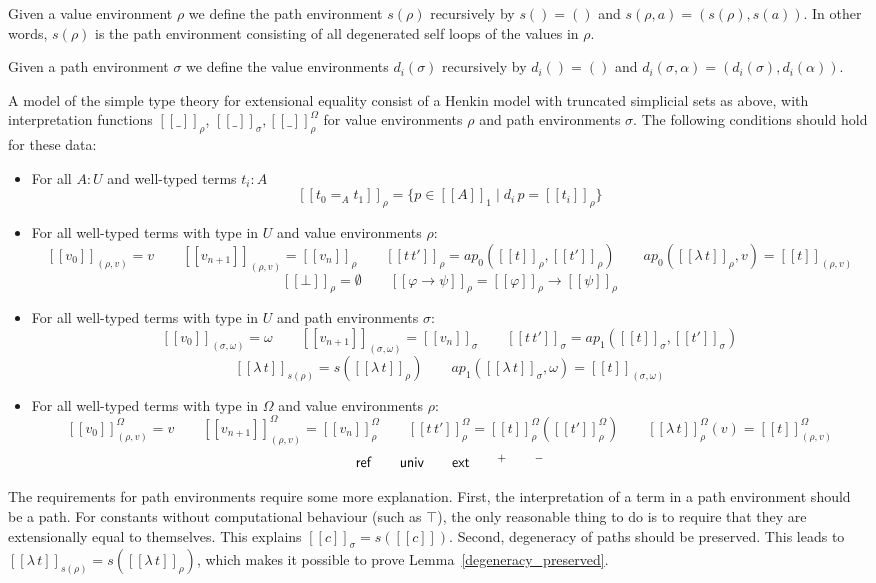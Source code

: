 \documentclass[10pt,a4paper]{article}
\newcommand{\sbr}[1]{[\![#1]\!]}
\newcommand{\semr}[1]{[\![#1]\!]_{\rho}}
\newcommand{\semrO}[1]{[\![#1]\!]^{\Omega}_{\rho}}
\newcommand{\sems}[1]{[\![#1]\!]_{\sigma}}
\newcommand{\set}[1]{\{#1\}}
\newcommand{\Ref}{{\sf ref}}
\newcommand{\ext}{{\sf ext}}
\newcommand{\univ}{{\sf univ}}
\begin{document}
Given a value environment $\rho$ we define the path environment 
$s(\rho)$ recursively by $s()=()$ and $s(\rho,a)=(s(\rho),s(a))$. 
In other words, $s(\rho)$ is the path environment consisting of all degenerated
self loops of the values in $\rho$.

Given a path environment $\sigma$ we define the value environments
$d_i(\sigma)$ recursively by $d_i()=()$ and $d_i(\sigma,\alpha)=(d_i(\sigma),d_i(\alpha))$.

\begin{definition}
A model of the simple type theory for extensional equality consist of
a Henkin model with truncated simplicial sets as above, with
interpretation functions $\semr{\_}$, $\sems{\_}, \semrO{\_}$ for value
environments $\rho$ and path environments $\sigma$. 
The following conditions should hold for these data:
\begin{itemize}
\item For all $A:U$ and well-typed terms $t_i:A$
\[
\semr{t_0 =_A t_1} = \set{p\in\sbr{A}_1 \mid d_i\,p = \semr{t_i}}
\]
\item For all well-typed terms with type in $U$ and value environments $\rho$:
\[
\sbr{v_0}_{(\rho,v)} = v
\quad\quad \sbr{v_{n+1}}_{(\rho,v)} = \semr{v_n}
\quad\quad \semr{t\,t'} = ap_0(\semr{t},\semr{t'})
\quad\quad ap_0(\semr{\lambda\,t},v) = \sbr{t}_{(\rho,v)}
\]
\[
\semr{\bot}=\emptyset
\quad\quad \semr{\varphi\to\psi}=\semr{\varphi}\to\semr{\psi}
\]
\item For all well-typed terms with type in $U$ and path environments $\sigma$:
\[
\sbr{v_0}_{(\sigma,\omega)} = \omega
\quad\quad  \sbr{v_{n+1}}_{(\sigma,\omega)} = \sems{v_n}
\quad\quad \sems{t\,t'} = ap_1(\sems{t},\sems{t'})
\]
\[
\sbr{\lambda\,t}_{s(\rho)} = s(\semr{\lambda\,t})
\quad\quad ap_1(\sems{\lambda\,t},\omega) = \sbr{t}_{(\sigma,\omega)}
\]
\item For all well-typed terms with type in $\Omega$ and value environments $\rho$:
\[
\sbr{v_0}^{\Omega}_{(\rho,v)} = v
\quad\quad \sbr{v_{n+1}}^{\Omega}_{(\rho,v)} = \semrO{v_n}
\quad\quad \semrO{t\,t'} = \semrO{t}(\semrO{t'})
\quad\quad \semrO{\lambda\,t}(v) = \sbr{t}^{\Omega}_{(\rho,v)}
\]
\[
\Ref\quad\quad\univ\quad\quad\ext\quad\quad{}^+\quad\quad{}^-
\]
\end{itemize}
\end{definition}
 
The requirements for path environments require some more explanation. 
First, the interpretation
of a term in a path environment should be a path. 
For constants without computational behaviour (such as $\top$), 
the only reasonable thing to do is to require that they are extensionally equal to themselves. 
This explains $\sems{c} = s(\sbr{c})$.
Second, degeneracy of paths should be preserved. 
This leads to $\sbr{\lambda\,t}_{s(\rho)} = s(\semr{\lambda\,t})$,
which makes it possible to prove Lemma~\ref{degeneracy_preserved}.
\end{document}
